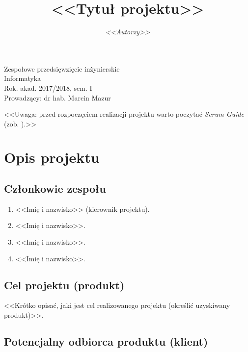 \documentclass[a4paper]{article}
\title{\bf{<<Tytuł projektu>>}}
\author{{\em <<Autorzy>>}}
\date{}
\begin{document}
\begin{titlepage}
\maketitle
\thispagestyle{empty}
\bigskip
\begin{center}
Zespołowe przedsięwzięcie inżynierskie\\[2mm]

Informatyka\\[2mm]

Rok. akad. 2017/2018, sem. I\\[2mm]

Prowadzący: dr hab. Marcin Mazur
\end{center}
\end{titlepage}

\tableofcontents
\thispagestyle{empty}

\newpage

<<Uwaga: przed rozpoczęciem realizacji projektu warto poczytać {\em Scrum Guide} (zob. \cite{SchSut}).>>

\section{Opis projektu}

\subsection{Członkowie zespołu}

\begin{enumerate}
\item <<Imię i nazwisko>> (kierownik projektu).
\item <<Imię i nazwisko>>.
\item <<Imię i nazwisko>>.
\item <<Imię i nazwisko>>.
\end{enumerate}

\subsection{Cel projektu (produkt)}

<<Krótko opisać, jaki jest cel realizowanego projektu (określić uzyskiwany produkt)>>.

\subsection{Potencjalny odbiorca produktu (klient)}
\end{document}
